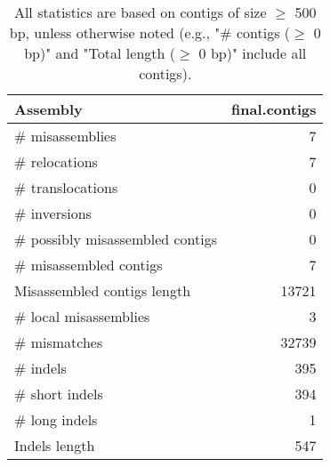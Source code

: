 \documentclass[12pt,a4paper]{article}
\begin{document}
\begin{table}[ht]
\begin{center}
\caption{All statistics are based on contigs of size $\geq$ 500 bp, unless otherwise noted (e.g., "\# contigs ($\geq$ 0 bp)" and "Total length ($\geq$ 0 bp)" include all contigs).}
\begin{tabular}{|l*{1}{|r}|}
\hline
Assembly & final.contigs \\ \hline
\# misassemblies & 7 \\ \hline
\hspace{5mm}\# relocations & 7 \\ \hline
\hspace{5mm}\# translocations & 0 \\ \hline
\hspace{5mm}\# inversions & 0 \\ \hline
\# possibly misassembled contigs & 0 \\ \hline
\# misassembled contigs & 7 \\ \hline
Misassembled contigs length & 13721 \\ \hline
\# local misassemblies & 3 \\ \hline
\# mismatches & 32739 \\ \hline
\# indels & 395 \\ \hline
\hspace{5mm}\# short indels & 394 \\ \hline
\hspace{5mm}\# long indels & 1 \\ \hline
Indels length & 547 \\ \hline
\end{tabular}
\end{center}
\end{table}
\end{document}
